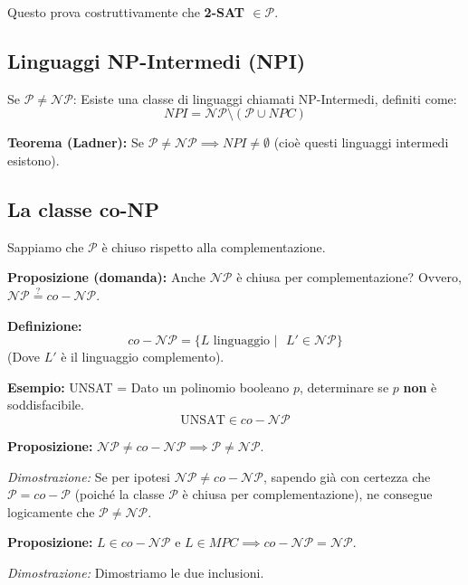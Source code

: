 Questo prova costruttivamente che \textbf{2-SAT $\in \mathcal{P}$}.


\vspace{0.8cm}

\subsection{Linguaggi NP-Intermedi (NPI)}

Se $\mathcal{P} \neq \mathcal{NP}$:
Esiste una classe di linguaggi chiamati NP-Intermedi, definiti come:
$$ NPI = \mathcal{NP} \setminus (\mathcal{P} \cup NPC) $$

\textbf{Teorema (Ladner):} 
Se $\mathcal{P} \neq \mathcal{NP} \implies NPI \neq \emptyset$ (cioè questi linguaggi intermedi esistono).


\vspace{0.8cm}

\subsection{La classe co-NP}

Sappiamo che $\mathcal{P}$ è chiuso rispetto alla complementazione.

\textbf{Proposizione (domanda):} Anche $\mathcal{NP}$ è chiusa per complementazione? Ovvero, $\mathcal{NP} \stackrel{?}{=} co-\mathcal{NP}$.

\textbf{Definizione:} 
$$ co-\mathcal{NP} = \{ L \text{ linguaggio } | \text{ } L' \in \mathcal{NP} \} $$
(Dove $L'$ è il linguaggio complemento).

\textbf{Esempio:} UNSAT = Dato un polinomio booleano $p$, determinare se $p$ \textbf{non} è soddisfacibile.
$$ \text{UNSAT} \in co-\mathcal{NP} $$

\vspace{0.5cm}
\textbf{Proposizione:} $\mathcal{NP} \neq co-\mathcal{NP} \implies \mathcal{P} \neq \mathcal{NP}$.

\textit{Dimostrazione:} 
Se per ipotesi $\mathcal{NP} \neq co-\mathcal{NP}$, sapendo già con certezza che $\mathcal{P} = co-\mathcal{P}$ (poiché la classe $\mathcal{P}$ è chiusa per complementazione), ne consegue logicamente che $\mathcal{P} \neq \mathcal{NP}$.

\vspace{0.8cm}

\textbf{Proposizione:} $L \in co-\mathcal{NP}$ e $L \in MPC \implies co-\mathcal{NP} = \mathcal{NP}$.

\textit{Dimostrazione:}
Dimostriamo le due inclusioni.

